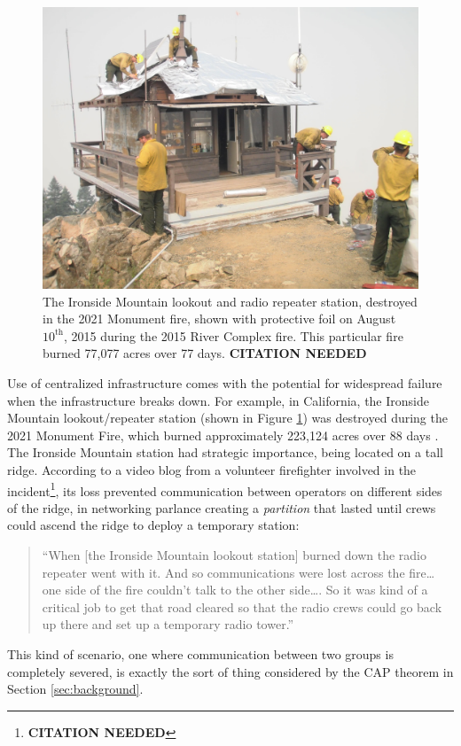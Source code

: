 \documentclass[]             %
{NASA}                       %
\theoremstyle{definition}
\newcommand{\citationneeded}{\footnote{\textbf{CITATION NEEDED}}}
\begin{document}
\begin{figure}[t]
  \centering
  \includegraphics[scale=0.085]{images/ironside.jpg}
  \caption{The Ironside Mountain lookout and radio repeater station, destroyed in the 2021
    Monument fire, shown with protective foil on August
    $10^\textrm{th}$, 2015 during the 2015 River Complex fire. This
    particular fire burned 77,077 acres over 77 days. \textbf{CITATION NEEDED}}
  \label{fig:ironside}
\end{figure}

Use of centralized infrastructure comes with the potential for
widespread failure when the infrastructure breaks down. For example, in
California, the Ironside Mountain lookout/repeater station (shown in
Figure \ref{fig:ironside}) was destroyed during the 2021 Monument
Fire, which burned approximately 223,124 acres over 88 days
\cite{2021:monumentfire}. The Ironside Mountain station had strategic
importance, being located on a tall ridge. According to a video blog
from a volunteer firefighter involved in the incident\citationneeded,
its loss prevented communication between operators on different sides
of the ridge, in networking parlance creating a \emph{partition} that
lasted until crews could ascend the ridge to deploy a temporary
station:
\begin{quote}
  ``When {[}the Ironside Mountain lookout station{]} burned down the radio
  repeater went with it. And so communications were lost across the
  fire\ldots{} one side of the fire couldn't talk to the other side\ldots.
  So it was kind of a critical job to get that road cleared so that the
  radio crews could go back up there and set up a temporary radio tower.''
\end{quote}
This kind of scenario, one where communication between two groups is
completely severed, is exactly the sort of thing considered by the CAP
theorem in Section \ref{sec:background}.
\end{document}
